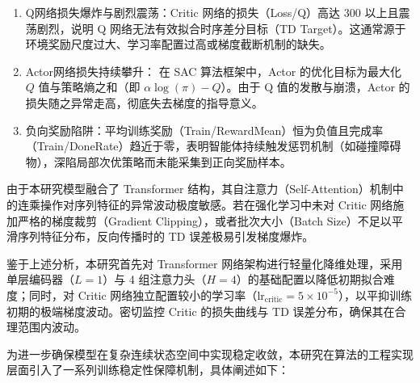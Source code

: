 \documentclass[
  oneside,
  degree=bachelor,
  fullwidthstop=false,
  fontset=fandol,
  times=false,
  minted=true,
  biblatex=true,
]{tongjithesis}
\begin{document}
\begin{enumerate}
    \item Q网络损失爆炸与剧烈震荡：Critic 网络的损失（Loss/Q）高达 300 以上且震荡剧烈，说明 Q 网络无法有效拟合时序差分目标（TD Target）。这通常源于环境奖励尺度过大、学习率配置过高或梯度截断机制的缺失。
    \item Actor网络损失持续攀升： 在 SAC 算法框架中，Actor 的优化目标为最大化 $Q$ 值与策略熵之和（即 $\alpha \log(\pi) - Q$）。由于 Q 值的发散与崩溃，Actor 的损失随之异常走高，彻底失去梯度的指导意义。
    \item 负向奖励陷阱：平均训练奖励（Train/RewardMean）恒为负值且完成率（Train/DoneRate）趋近于零，表明智能体持续触发惩罚机制（如碰撞障碍物），深陷局部次优策略而未能采集到正向奖励样本。
\end{enumerate}

由于本研究模型融合了 Transformer 结构，其自注意力（Self-Attention）机制中的连乘操作对序列特征的异常波动极度敏感。若在强化学习中未对 Critic 网络施加严格的梯度裁剪（Gradient Clipping），或者批次大小（Batch Size）不足以平滑序列特征分布，反向传播时的 TD 误差极易引发梯度爆炸。

鉴于上述分析，本研究首先对 Transformer 网络架构进行轻量化降维处理，采用单层编码器（$L=1$）与 4 组注意力头（$H=4$）的基础配置以降低初期拟合难度；同时，对 Critic 网络独立配置较小的学习率（$\mathrm{lr}_{\mathrm{critic}}=5 \times 10^{-5}$），以平抑训练初期的极端梯度波动。密切监控 Critic 的损失曲线与 TD 误差分布，确保其在合理范围内波动。

为进一步确保模型在复杂连续状态空间中实现稳定收敛，本研究在算法的工程实现层面引入了一系列训练稳定性保障机制，具体阐述如下：
\end{document}
